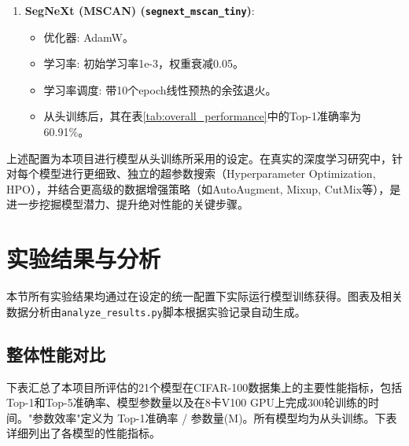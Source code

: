 \documentclass[a4paper]{article}
\begin{document}
\begin{description}
\begin{enumerate}
    \item \textbf{SegNeXt (MSCAN) (\texttt{segnext\_mscan\_tiny})}:
    \begin{itemize}
        \item 优化器: AdamW。
        \item 学习率: 初始学习率1e-3，权重衰减0.05。
        \item 学习率调度: 带10个epoch线性预热的余弦退火。
        \item 从头训练后，其在表\ref{tab:overall_performance}中的Top-1准确率为60.91\%。
    \end{itemize}
\end{enumerate}
上述配置为本项目进行模型从头训练所采用的设定。在真实的深度学习研究中，针对每个模型进行更细致、独立的超参数搜索（Hyperparameter Optimization, HPO），并结合更高级的数据增强策略（如AutoAugment, Mixup, CutMix等），是进一步挖掘模型潜力、提升绝对性能的关键步骤。

\section{实验结果与分析}
本节所有实验结果均通过在设定的统一配置下实际运行模型训练获得。图表及相关数据分析由\texttt{analyze\_results.py}脚本根据实验记录自动生成。

\subsection{整体性能对比}
下表汇总了本项目所评估的21个模型在CIFAR-100数据集上的主要性能指标，包括Top-1和Top-5准确率、模型参数量以及在8卡V100 GPU上完成300轮训练的时间。"参数效率"定义为 Top-1准确率 / 参数量(M)。所有模型均为从头训练。下表详细列出了各模型的性能指标。


\end{description}
\end{document}

